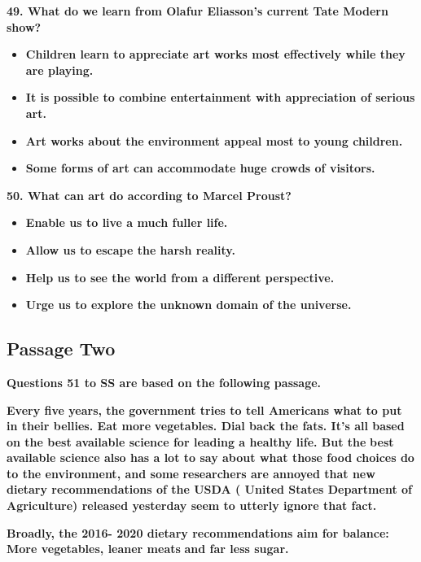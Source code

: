 \documentclass[UTF8,11pt]{ctexart}
\begin{document}
\textbf{49. What do we learn from Olafur Eliasson's current Tate Modern show?}


\begin{itemize}[leftmargin=2em,itemsep=.2em,topsep=.4em]\item[A.] \textbf{Children learn to appreciate art works most effectively while they are playing.}
\item[B.] \textbf{It is possible to combine entertainment with appreciation of serious art.}
\item[C.] \textbf{Art works about the environment appeal most to young children.}
\item[D.] \textbf{Some forms of art can accommodate huge crowds of visitors.}
\end{itemize}

\textbf{50. What can art do according to Marcel Proust?}


\begin{itemize}[leftmargin=2em,itemsep=.2em,topsep=.4em]\item[A.] \textbf{Enable us to live a much fuller life.}
\item[B.] \textbf{Allow us to escape the harsh reality.}
\item[C.] \textbf{Help us to see the world from a different perspective.}
\item[D.] \textbf{Urge us to explore the unknown domain of the universe.}
\end{itemize}

\subsection*{\textbf{Passage Two}}


\textbf{Questions 51 to SS are based on the following passage.}


\textbf{Every five years, the government tries to tell Americans what to put in their bellies. Eat more} \textbf{vegetables. Dial back the fats. It's all based on the best available science for leading a healthy life. But the} \textbf{best available science also has a lot to say about what those food choices do to the environment, and some} \textbf{researchers are annoyed that new dietary recommendations of the USDA ( United States Department of} \textbf{Agriculture) released yesterday seem to utterly ignore that fact.}


\textbf{Broadly, the 2016- 2020 dietary recommendations aim for balance: More vegetables, leaner meats} \textbf{and far less sugar.}
\end{document}
